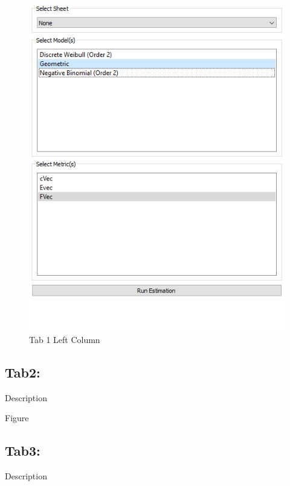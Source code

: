 \documentclass[conference]{IEEEtran}
\begin{document}
\begin{figure}[!ht]
	\centerline{\includegraphics[width=\columnwidth]{Figures/tab1_left_column.PNG}{}}
	\caption{Tab 1 Left Column}
	\label{fig:tab1_left_column}
\end{figure}



\subsection{Tab2: }\label{sec:Tab2}
Description

Figure 

\subsection{Tab3: }\label{sec:Tab3}
Description
\end{document}
